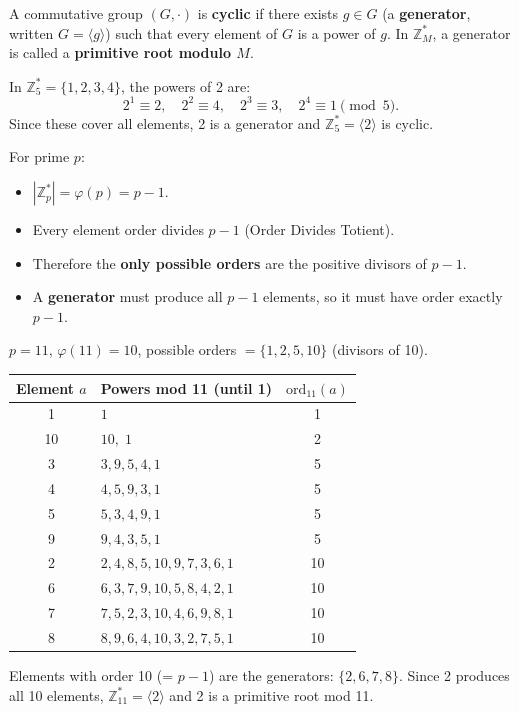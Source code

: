 \begin{definition}
A commutative group $(G, \cdot)$ is \textbf{cyclic} if there exists $g \in G$ (a \textbf{generator}, written $G = \langle g \rangle$) such that every element of $G$ is a power of $g$. In $\mathbb{Z}_M^*$, a generator is called a \textbf{primitive root modulo $M$}.
\end{definition}

\begin{example}
In $\mathbb{Z}_5^* = \{1,2,3,4\}$, the powers of 2 are:
\[
2^1 \equiv 2,\quad 2^2 \equiv 4,\quad 2^3 \equiv 3,\quad 2^4 \equiv 1 \pmod{5}.
\]
Since these cover all elements, 2 is a generator and $\mathbb{Z}_5^* = \langle 2 \rangle$ is cyclic.
\end{example}

\begin{remark}
For prime $p$:
\begin{itemize}
    \item $|\mathbb{Z}_p^*| = \varphi(p) = p-1$.
    \item Every element order divides $p-1$ (Order Divides Totient).
    \item Therefore the \textbf{only possible orders} are the positive divisors of $p-1$.
    \item A \textbf{generator} must produce all $p-1$ elements, so it must have order exactly $p-1$.
\end{itemize}
\end{remark}

\begin{example}
$p=11$, $\varphi(11)=10$, possible orders $= \{1, 2, 5, 10\}$ (divisors of 10).

\medskip
\begin{center}
\begin{tabular}{c|l|c}
Element $a$ & Powers mod 11 (until 1) & $\mathrm{ord}_{11}(a)$ \\
\hline
1 & $1$ & 1 \\
10 & $10,\;1$ & 2 \\
3 & $3,9,5,4,1$ & 5 \\
4 & $4,5,9,3,1$ & 5 \\
5 & $5,3,4,9,1$ & 5 \\
9 & $9,4,3,5,1$ & 5 \\
2 & $2,4,8,5,10,9,7,3,6,1$ & 10 \\
6 & $6,3,7,9,10,5,8,4,2,1$ & 10 \\
7 & $7,5,2,3,10,4,6,9,8,1$ & 10 \\
8 & $8,9,6,4,10,3,2,7,5,1$ & 10 \\
\end{tabular}
\end{center}

\medskip
Elements with order 10 (= $p-1$) are the generators: $\{2, 6, 7, 8\}$. Since 2 produces all 10 elements, $\mathbb{Z}_{11}^* = \langle 2 \rangle$ and 2 is a primitive root mod 11.
\end{example}

